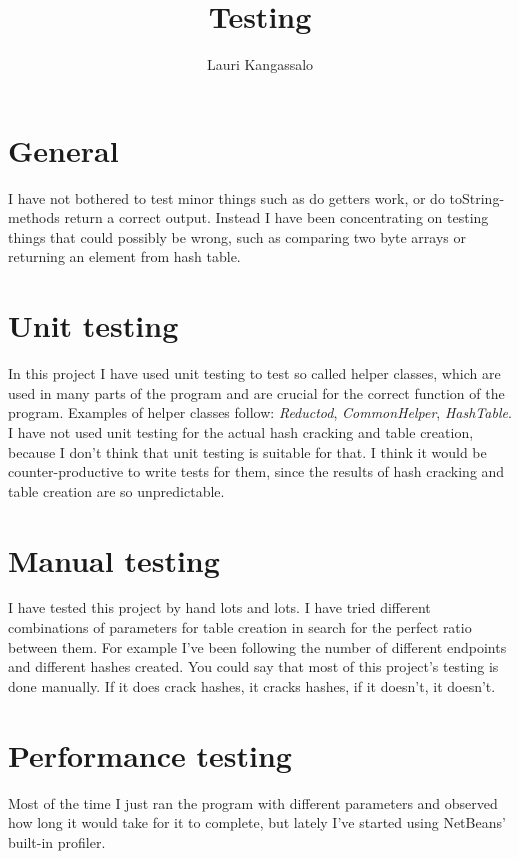 \documentclass[a4paper, 11pt, finnish]{article}
\title{Testing}
\author{Lauri Kangassalo}
\begin{document}
  \maketitle
\section*{General}
I have not bothered to test minor things such as do getters work, or do toString-methods return a correct output. Instead I have been concentrating on testing things that could possibly be wrong, such as comparing two byte arrays or returning an element from hash table.

\section*{Unit testing}
In this project I have used unit testing to test so called helper classes, which are used in many parts of the program and are crucial for the correct function of the program. Examples of helper classes follow: \emph{Reductod}, \emph{CommonHelper}, \emph{HashTable}. I have not used unit testing for the actual hash cracking and table creation, because I don't think that unit testing is suitable for that. I think it would be counter-productive to write tests for them, since the results of hash cracking and table creation are so unpredictable.

\section*{Manual testing}
I have tested this project by hand lots and lots. I have tried different combinations of parameters for table creation in search for the perfect ratio between them. For example I've been following the number of different endpoints and different hashes created. You could say that most of this project's testing is done manually. If it does crack hashes, it cracks hashes, if it doesn't, it doesn't.

\section*{Performance testing}
Most of the time I just ran the program with different parameters and observed how long it would take for it to complete, but lately I've started using NetBeans' built-in profiler.
\end{document}
